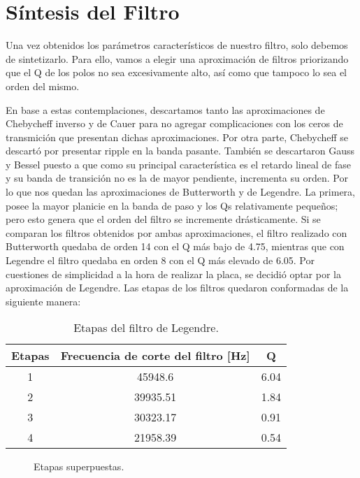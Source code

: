 \documentclass[../../ASSD_TP1_G7.tex]{subfiles}
\begin{document}
\section{Síntesis del Filtro}

Una vez obtenidos los parámetros característicos de nuestro filtro,
solo debemos de sintetizarlo. Para ello, vamos a elegir una aproximación
de filtros priorizando que el Q de los polos no sea excesivamente
alto, así como que tampoco lo sea el orden del mismo.

En base a estas contemplaciones, descartamos tanto las aproximaciones
de Chebycheff inverso y de Cauer para no agregar complicaciones con
los ceros de transmición que presentan dichas aproximaciones. Por
otra parte, Chebycheff se descartó por presentar ripple en la banda
pasante. También se descartaron Gauss y Bessel puesto a que como su
principal característica es el retardo lineal de fase y su banda de
transición no es la de mayor pendiente, incrementa su orden. Por lo
que nos quedan las aproximaciones de Butterworth y de Legendre. La
primera, posee la mayor planicie en la banda de paso y los Qs relativamente
pequeños; pero esto genera que el orden del filtro se incremente drásticamente.
Si se comparan los filtros obtenidos por ambas aproximaciones, el
filtro realizado con Butterworth quedaba de orden 14 con el Q más
bajo de 4.75, mientras que con Legendre el filtro quedaba en orden
8 con el Q más elevado de 6.05. Por cuestiones de simplicidad a la
hora de realizar la placa, se decidió optar por la aproximación de
Legendre. Las etapas de los filtros quedaron conformadas de la siguiente
manera:

\begin{table}[H]
\begin{centering}
\begin{tabular}{|c|c|c|}
\hline 
Etapas & Frecuencia de corte del filtro {[}Hz{]} & Q\\
\hline 
\hline 
1 & 45948.6 & 6.04\\
\hline 
2 & 39935.51 & 1.84\\
\hline 
3 & 30323.17 & 0.91\\
\hline 
4 & 21958.39 & 0.54\\
\hline 
\end{tabular}\caption{Etapas del filtro de Legendre.\label{tab:Etapas-del-filtro}}
\par\end{centering}
\end{table}

\begin{figure}[H]

\caption{Etapas superpuestas.}

\end{figure}
\end{document}
